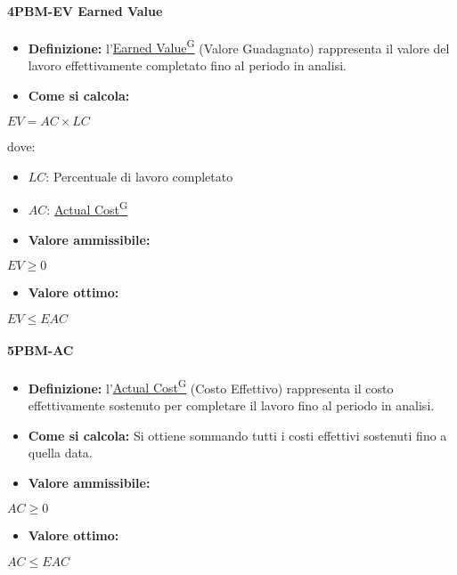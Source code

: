 \paragraph*{4PBM-EV Earned Value}
\begin{itemize}
    \item \textbf{Definizione:} l’\href{https://code7crusaders.github.io/docs/PB/documentazione_interna/glossario.html#earned-value}{Earned Value\textsuperscript{G}} (Valore Guadagnato) rappresenta il valore del lavoro effettivamente completato fino al periodo in analisi.
    \item \textbf{Come si calcola:}
\end{itemize}
\begin{center}
   $EV = AC \times LC$ 
\end{center}
dove:
\begin{itemize}[label=$\rightarrow$]
    \item $LC$: Percentuale di lavoro completato
    \item $AC$: \href{https://code7crusaders.github.io/docs/PB/documentazione_interna/glossario.html#actual-cost}{Actual Cost\textsuperscript{G}}
\end{itemize}
\begin{itemize}
    \item \textbf{Valore ammissibile:}
\end{itemize}
\begin{center}
    $EV \geq 0$
\end{center}
\begin{itemize}
    \item \textbf{Valore ottimo:}
\end{itemize}
\begin{center}
    $EV \leq EAC$
\end{center}

\paragraph*{5PBM-AC}
\begin{itemize}
    \item \textbf{Definizione:} l’\href{https://code7crusaders.github.io/docs/PB/documentazione_interna/glossario.html#actual-cost}{Actual Cost\textsuperscript{G}} (Costo Effettivo) rappresenta il costo effettivamente sostenuto per completare il lavoro fino al periodo in analisi.
    \item \textbf{Come si calcola:} Si ottiene sommando tutti i costi effettivi sostenuti fino a quella data.
\end{itemize}
\begin{itemize}
    \item \textbf{Valore ammissibile:}
\end{itemize}
\begin{center}
    $AC \geq 0$
\end{center}
\begin{itemize}
    \item \textbf{Valore ottimo:}
\end{itemize}
\begin{center}
    $AC \leq EAC$
\end{center}

